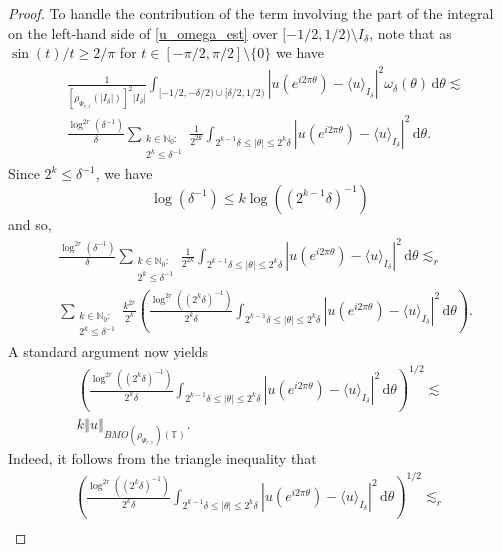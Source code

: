\documentclass[a4paper, leqno, 10pt]{amsart}
\numberwithin{equation}{section}
\newcommand{\dd}{\mathrm{d}}
\newcommand{\T}{\mathbb{T}}
\newcommand{\norm}[1]{\left\Vert#1\right\Vert}
\newcommand{\N}{\mathbb{N}}
\begin{document}
\begin{proof}
To handle the contribution of the term involving the part of the integral on the left-hand side of \eqref{u_omega_est} over $[-1/2, 1/2) \setminus I_{\delta}$, note that as $\sin (t)/t \geq 2/\pi $ for $t \in [-\pi/2, \pi/2] \setminus \{0 \}$ we have
\begin{align*}
& \frac{1} { \left[ \rho_{\Psi_{r,1}} (|I_{\delta}|) \right]^2 |I_{\delta}|} \int_{[- 1/2, - \delta/2) \cup [\delta/2, 1/2)} | u ( e^{i 2 \pi \theta} ) - \langle u \rangle_{I_{\delta}} |^2 \omega_{\delta} ( \theta ) \, \dd \theta \lesssim \\ 
& \frac{\log^{2r} ( \delta^{-1} )} { \delta } \sum_{\substack{k \in \N_0 :\\ 2^k \leq \delta^{-1} }} \frac{1} { 2^{2k} } \int_{ 2^{k-1} \delta \leq |\theta| \leq 2^k \delta } | u ( e^{i 2 \pi \theta} ) - \langle u \rangle_{I_{\delta}} |^2 \, \dd \theta .
\end{align*}
Since $2^k \leq \delta^{-1}$, we have
\[
\log \left( \delta^{-1} \right) \leq k
\log \left( ( 2^{k-1} \delta)^{-1} \right) 
\]
and so,
\begin{align*}
& \frac{\log^{2r} ( \delta^{-1} )} {  \delta } \sum_{\substack{k \in \N_0 :\\ 2^k \leq \delta^{-1} }}  \frac{1} { 2^{2k} } \int_{ 2^{k-1} \delta \leq |\theta|  \leq 2^k \delta } | u ( e^{i 2 \pi \theta} ) - \langle u \rangle_{I_{\delta}} |^2 \, \dd \theta \lesssim_r \\ 
& \sum_{\substack{k \in \N_0 :\\ 2^k \leq \delta^{-1} }} \frac{k^{2r}} { 2^{k} } \left( \frac{\log^{2r} \left( (2^k \delta)^{-1} \right)} {  2^k \delta } \int_{ 2^{k-1} \delta \leq |\theta| \leq 2^k \delta } | u ( e^{i 2 \pi \theta} ) - \langle u \rangle_{I_{\delta}} |^2  \, \dd \theta \right) .
\end{align*}
A standard argument now yields
\begin{multline}\label{tr_ineq_BMO}
\left( \frac{\log^{2r} \left( (2^k \delta)^{-1} \right)} { 2^k \delta } \int_{ 2^{k-1} \delta \leq |\theta| \leq 2^k \delta } | u ( e^{i 2 \pi \theta} ) - \langle u \rangle_{I_{\delta}} |^2 \, \dd \theta \right)^{1/2} \lesssim  \\
k \norm{ u }_{BMO (\rho_{\Psi_{r,1}}) (\T)}.
\end{multline}
Indeed, it follows from the triangle inequality that
\begin{align*} 
\left( \frac{\log^{2r} \left( (2^k \delta)^{-1} \right)} { 2^k \delta } \int_{ 2^{k-1} \delta \leq |\theta| \leq 2^k \delta } | u ( e^{i 2 \pi \theta} ) - \langle u \rangle_{I_{\delta}} |^2 \, \dd \theta \right)^{1/2}  \lesssim_r \\ 

\end{align*}
\end{proof}
\end{document}
